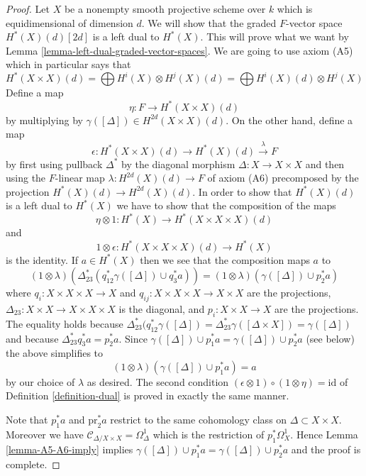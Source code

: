 \begin{proof}
Let $X$ be a nonempty smooth projective scheme over $k$ which is
equidimensional of dimension $d$. We will show that the graded $F$-vector space
$H^*(X)(d)[2d]$ is a left dual to $H^*(X)$. This will prove what we want by
Lemma \ref{lemma-left-dual-graded-vector-spaces}. We are
going to use axiom (A5) which in particular says that
$$
H^*(X \times X)(d) =
\bigoplus H^i(X) \otimes H^j(X)(d) =
\bigoplus H^i(X)(d) \otimes H^j(X)
$$
Define a map
$$
\eta : F \longrightarrow H^*(X \times X)(d)
$$
by multiplying by $\gamma([\Delta]) \in H^{2d}(X \times X)(d)$.
On the other hand, define a map
$$
\epsilon :
H^*(X \times X)(d) \longrightarrow H^*(X)(d) \xrightarrow{\lambda} F
$$
by first using pullback $\Delta^*$ by the diagonal morphism
$\Delta : X \to X \times X$ and then using the $F$-linear map
$\lambda : H^{2d}(X)(d) \to F$ of axiom (A6) precomposed
by the projection $H^*(X)(d) \to H^{2d}(X)(d)$.
In order to show that $H^*(X)(d)$ is a left dual to $H^*(X)$
we have to show that the composition of the maps
$$
\eta \otimes 1 :
H^*(X) \longrightarrow H^*(X \times X \times X)(d)
$$
and
$$
1 \otimes \epsilon : H^*(X \times X \times X)(d) \longrightarrow H^*(X)
$$
is the identity. If $a \in H^*(X)$ then we see
that the composition maps $a$ to
$$
(1 \otimes \lambda)(\Delta_{23}^*(q_{12}^*\gamma([\Delta]) \cup q_3^*a)) =
(1 \otimes \lambda)(\gamma([\Delta]) \cup p_2^*a)
$$
where $q_i : X \times X \times X \to X$ and
$q_{ij} : X \times X \times X \to X \times X$ are the projections,
$\Delta_{23} : X \times X \to X \times X \times X$ is the diagonal, and
$p_i : X \times X \to X$ are the projections.
The equality holds because $\Delta_{23}^*(q_{12}^*\gamma([\Delta]) =
\Delta_{23}^*\gamma([\Delta \times X]) = \gamma([\Delta])$
and because $\Delta_{23}^* q_3^*a = p_2^*a$.
Since $\gamma([\Delta]) \cup p_1^*a = \gamma([\Delta]) \cup p_2^*a$
(see below) the above simplifies to
$$
(1 \otimes \lambda)(\gamma([\Delta]) \cup p_1^*a) = a
$$
by our choice of $\lambda$ as desired. The second condition
$(\epsilon \otimes 1) \circ (1 \otimes \eta) = \text{id}$
of Definition \ref{definition-dual} is proved in exactly the
same manner.

\medskip\noindent
Note that $p_1^*a$ and $\text{pr}_2^*a$ restrict to the same
cohomology class on $\Delta \subset X \times X$. Moreover we
have $\mathcal{C}_{\Delta/X \times X} = \Omega^1_\Delta$ which
is the restriction of $p_1^*\Omega^1_X$. Hence
Lemma \ref{lemma-A5-A6-imply} implies
$\gamma([\Delta]) \cup p_1^*a = \gamma([\Delta]) \cup p_2^*a$
and the proof is complete.
\end{proof}

